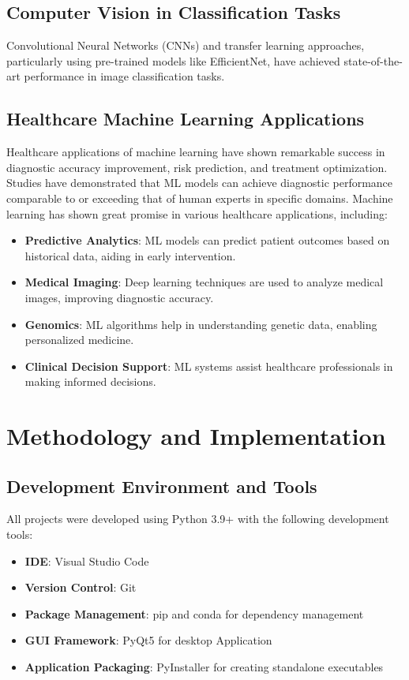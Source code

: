 \documentclass[12pt, a4paper]{article}
\begin{document}
\subsection{Computer Vision in Classification Tasks}
Convolutional Neural Networks (CNNs) and transfer learning approaches, particularly using pre-trained models like EfficientNet, have achieved state-of-the-art performance in image classification tasks.

\subsection{Healthcare Machine Learning Applications}
Healthcare applications of machine learning have shown remarkable success in diagnostic accuracy improvement, risk prediction, and treatment optimization. Studies have demonstrated that ML models can achieve diagnostic performance comparable to or exceeding that of human experts in specific domains.
Machine learning has shown great promise in various healthcare applications, including:

\begin{itemize}
    \item \textbf{Predictive Analytics}: ML models can predict patient outcomes based on historical data, aiding in early intervention.
    \item \textbf{Medical Imaging}: Deep learning techniques are used to analyze medical images, improving diagnostic accuracy.
    \item \textbf{Genomics}: ML algorithms help in understanding genetic data, enabling personalized medicine.
    \item \textbf{Clinical Decision Support}: ML systems assist healthcare professionals in making informed decisions.
\end{itemize}

\section{Methodology and Implementation}

\subsection{Development Environment and Tools}
All projects were developed using Python 3.9+ with the following development tools:
\begin{itemize}
    \item \textbf{IDE}: Visual Studio Code
    \item \textbf{Version Control}: Git
    \item \textbf{Package Management}: pip and conda for dependency management
    \item \textbf{GUI Framework}: PyQt5 for desktop Application
    \item \textbf{Application Packaging}: PyInstaller for creating standalone executables
\end{itemize}
\end{document}
